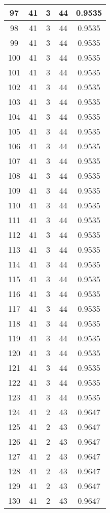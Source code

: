 \documentclass[letterpaper, 12pt]{article}
\begin{document}
\begin{longtable}{|c|c|c|c|c|}
\hline
97 & 41 & 3 & 44 & 0.9535 \\
\hline
98 & 41 & 3 & 44 & 0.9535 \\
\hline
99 & 41 & 3 & 44 & 0.9535 \\
\hline
100 & 41 & 3 & 44 & 0.9535 \\
\hline
101 & 41 & 3 & 44 & 0.9535 \\
\hline
102 & 41 & 3 & 44 & 0.9535 \\
\hline
103 & 41 & 3 & 44 & 0.9535 \\
\hline
104 & 41 & 3 & 44 & 0.9535 \\
\hline
105 & 41 & 3 & 44 & 0.9535 \\
\hline
106 & 41 & 3 & 44 & 0.9535 \\
\hline
107 & 41 & 3 & 44 & 0.9535 \\
\hline
108 & 41 & 3 & 44 & 0.9535 \\
\hline
109 & 41 & 3 & 44 & 0.9535 \\
\hline
110 & 41 & 3 & 44 & 0.9535 \\
\hline
111 & 41 & 3 & 44 & 0.9535 \\
\hline
112 & 41 & 3 & 44 & 0.9535 \\
\hline
113 & 41 & 3 & 44 & 0.9535 \\
\hline
114 & 41 & 3 & 44 & 0.9535 \\
\hline
115 & 41 & 3 & 44 & 0.9535 \\
\hline
116 & 41 & 3 & 44 & 0.9535 \\
\hline
117 & 41 & 3 & 44 & 0.9535 \\
\hline
118 & 41 & 3 & 44 & 0.9535 \\
\hline
119 & 41 & 3 & 44 & 0.9535 \\
\hline
120 & 41 & 3 & 44 & 0.9535 \\
\hline
121 & 41 & 3 & 44 & 0.9535 \\
\hline
122 & 41 & 3 & 44 & 0.9535 \\
\hline
123 & 41 & 3 & 44 & 0.9535 \\
\hline
124 & 41 & 2 & 43 & 0.9647 \\
\hline
125 & 41 & 2 & 43 & 0.9647 \\
\hline
126 & 41 & 2 & 43 & 0.9647 \\
\hline
127 & 41 & 2 & 43 & 0.9647 \\
\hline
128 & 41 & 2 & 43 & 0.9647 \\
\hline
129 & 41 & 2 & 43 & 0.9647 \\
\hline
130 & 41 & 2 & 43 & 0.9647 \\

\end{longtable}
\end{document}
